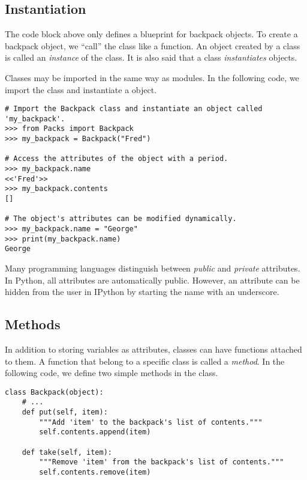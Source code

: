 \subsection*{Instantiation}

The  code block above only defines a blueprint for backpack objects.
To create a backpack object, we ``call'' the class like a function.
An object created by a class is called an \emph{instance} of the class.
It is also said that a class \emph{instantiates} objects.

Classes may be imported in the same way as modules.
In the following code, we import the  class and instantiate a  object.

\begin{lstlisting}
# Import the Backpack class and instantiate an object called 'my_backpack'.
>>> from Packs import Backpack
>>> my_backpack = Backpack("Fred")

# Access the attributes of the object with a period.
>>> my_backpack.name
<<'Fred'>>
>>> my_backpack.contents
[]

# The object's attributes can be modified dynamically.
>>> my_backpack.name = "George"
>>> print(my_backpack.name)
George
\end{lstlisting}

\begin{info}
Many programming languages distinguish between \emph{public} and \emph{private} attributes.
In Python, all attributes are automatically public.
However, an attribute can be hidden from the user in IPython by starting the name with an underscore. %
\end{info}

\subsection*{Methods}

In addition to storing variables as attributes, classes can have functions attached to them.
A function that belong to a specific class is called a \emph{method}.
In the following code, we define two simple methods in the  class.

\begin{lstlisting}
class Backpack(object):
    # ...
    def put(self, item):
        """Add 'item' to the backpack's list of contents."""
        self.contents.append(item)
    
    def take(self, item):
        """Remove 'item' from the backpack's list of contents."""
        self.contents.remove(item)
\end{lstlisting}


